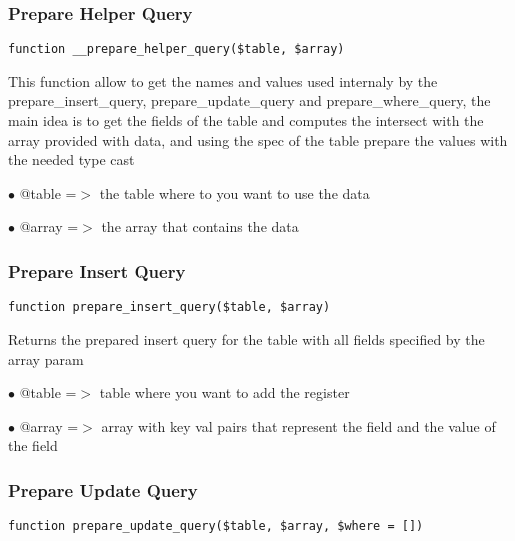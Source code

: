 \documentclass[a4paper]{article}
\begin{document}
\hypertarget{toc232}{}
\subsubsection{Prepare Helper Query}

\begin{lstlisting}
function __prepare_helper_query($table, $array)
\end{lstlisting}

This function allow to get the names and values used internaly by the
prepare\_insert\_query, prepare\_update\_query and prepare\_where\_query, the
main idea is to get the fields of the table and computes the intersect
with the array provided with data, and using the spec of the table
prepare the values with the needed type cast

\begin{compactitem}
\item[\color{myblue}$\bullet$] @table =$>$ the table where to you want to use the data
\item[\color{myblue}$\bullet$] @array =$>$ the array that contains the data
\end{compactitem}

\hypertarget{toc233}{}
\subsubsection{Prepare Insert Query}

\begin{lstlisting}
function prepare_insert_query($table, $array)
\end{lstlisting}

Returns the prepared insert query for the table with all fields specified
by the array param

\begin{compactitem}
\item[\color{myblue}$\bullet$] @table =$>$ table where you want to add the register
\item[\color{myblue}$\bullet$] @array =$>$ array with key val pairs that represent the field and the value
          of the field
\end{compactitem}

\hypertarget{toc234}{}
\subsubsection{Prepare Update Query}

\begin{lstlisting}
function prepare_update_query($table, $array, $where = [])
\end{lstlisting}
\end{document}
